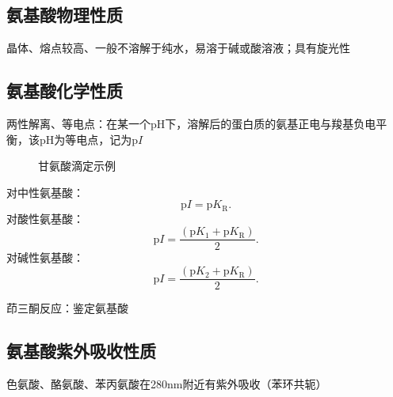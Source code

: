 \subsection{氨基酸物理性质}%
\label{sub:氨基酸物理性质}
晶体、熔点较高、一般不溶解于纯水，易溶于碱或酸溶液；具有旋光性
\subsection{氨基酸化学性质}%
\label{sub:氨基酸化学性质}
\begin{notation}
    两性解离、等电点：在某一个pH下，溶解后的蛋白质的氨基正电与羧基负电平衡，该pH为等电点，记为p$I$
\end{notation}
\begin{figure}[ht!]
    \centering
    \caption{甘氨酸滴定示例}
    \label{fig:甘氨酸滴定示例}
\end{figure}
对中性氨基酸：\[
    \text{p}I = \text{p}K_\text{R}
.\]
对酸性氨基酸：\[
    \text{p}I = \frac{\left( \text{p}K_1+\text{p}K_\text{R} \right)}{2} 
.\]
对碱性氨基酸：\[
    \text{p}I = \frac{\left( \text{p}K_2+\text{p}K_\text{R} \right)}{2}
.\]
\begin{notation}
    茚三酮反应：鉴定氨基酸
\end{notation}
\subsection{氨基酸紫外吸收性质}%
\label{sub:氨基酸紫外吸收性质}
色氨酸、酪氨酸、苯丙氨酸在280nm附近有紫外吸收（苯环共轭）
